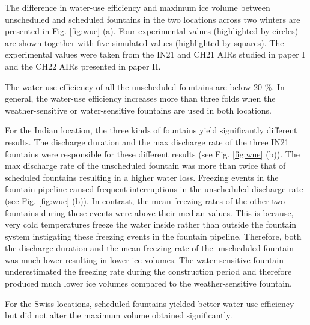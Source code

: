 The difference in water-use efficiency and maximum ice volume between unscheduled and scheduled fountains in the two
locations across two winters are presented in Fig. \ref{fig:wue} (a). Four experimental values (highlighted by
circles) are shown together with five simulated values (highlighted by squares).  The experimental values were
taken from the IN21 and CH21 AIRs studied in paper I and
the CH22 AIRs presented in paper II. 

The water-use efficiency of all the unscheduled fountains are below 20 \%. In general, the water-use efficiency
increases more than three folds when the weather-sensitive or water-sensitive fountains are used in both
locations.  

For the Indian location, the three kinds of fountains yield significantly different results.  The discharge
duration and the max discharge rate of the three IN21 fountains were responsible for these different results
(see Fig. \ref{fig:wue} (b)). The max discharge rate of the unscheduled fountain was more than twice that of
scheduled fountains resulting in a higher water loss. Freezing events in the fountain pipeline caused frequent
interruptions in the unscheduled discharge rate (see Fig. \ref{fig:wue} (b)). In contrast, the mean freezing
rates of the other two fountains during these events were above their median values. This is because, very cold
temperatures freeze the water inside rather than outside the fountain system instigating these freezing events in
the fountain pipeline. Therefore, both the discharge duration and the mean freezing rate of the unscheduled
fountain was much lower resulting in lower ice volumes. The water-sensitive fountain underestimated the freezing
rate during the construction period and therefore produced much lower ice volumes compared to the
weather-sensitive fountain. 

For the Swiss locations, scheduled fountains yielded better water-use efficiency but did not alter the maximum
volume obtained significantly. 




